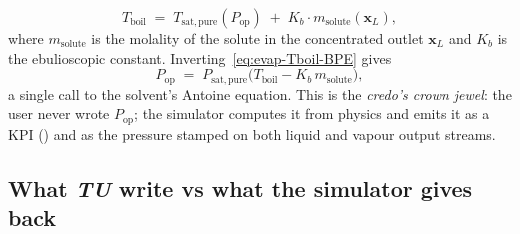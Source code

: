 \documentclass[11pt,a4paper]{article}
\newcommand{\xv}{\mathbf{x}}
\begin{document}
\begin{equation}
   T_{\!\text{boil}}
   \; = \;
   T_{\!\text{sat},\,\text{pure}}(P_{\!\text{op}})  \;+\;  K_b \cdot m_{\!\text{solute}}(\xv_L),
   \label{eq:evap-Tboil-BPE}
\end{equation}
where $m_{\!\text{solute}}$ is the molality of the solute in the
concentrated outlet $\xv_L$ and $K_b$ is the ebulioscopic constant.
Inverting~\eqref{eq:evap-Tboil-BPE} gives
\[
   P_{\!\text{op}}
   \; = \;
   P_{\!\text{sat},\,\text{pure}}\bigl(T_{\!\text{boil}} - K_b\,m_{\!\text{solute}}\bigr),
\]
a single call to the solvent's Antoine equation.  This is the
\emph{credo's crown jewel}: the user never wrote
$P_{\!\text{op}}$; the simulator computes it from physics and
emits it as a KPI () and as the pressure stamped on
both liquid and vapour output streams.

\subsection{What \emph{TU} write vs what the simulator gives back}
\end{document}
